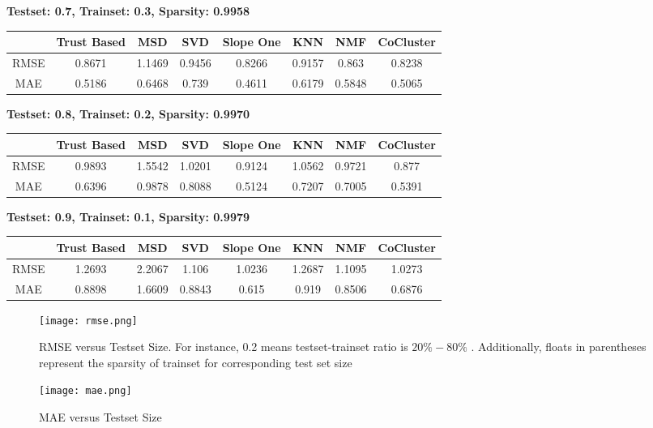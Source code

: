 	\vspace{1cm}
	\textbf{Testset: 0.7, Trainset: 0.3, Sparsity: 0.9958}
	\begin{center}
	\begin{tabular}{ | c | c | c | c | c | c | c | c |}
		\hline
		& Trust Based & MSD & SVD & Slope One & KNN & NMF & CoCluster\\ 
		\hline
		RMSE&0.8671  & 1.1469  & 0.9456  & 0.8266  & 0.9157  & 0.863  & 0.8238\\
		\hline
		MAE&0.5186  & 0.6468  & 0.739  & 0.4611  & 0.6179  & 0.5848  & 0.5065\\
		\hline
	\end{tabular}
	\end{center} 
	\vspace{1cm}
	\textbf{Testset: 0.8, Trainset: 0.2, Sparsity: 0.9970}
	\begin{center}
	\begin{tabular}{ | c | c | c | c | c | c | c | c |}
		\hline
		& Trust Based & MSD & SVD & Slope One & KNN & NMF & CoCluster\\ 
		\hline
		RMSE&0.9893  & 1.5542  & 1.0201  & 0.9124  & 1.0562  & 0.9721  & 0.877\\
		\hline
		MAE&0.6396  & 0.9878  & 0.8088  & 0.5124  & 0.7207  & 0.7005  & 0.5391\\
		\hline
	\end{tabular}
	\end{center} 
	\vspace{1cm}
	\textbf{Testset: 0.9, Trainset: 0.1, Sparsity: 0.9979}
	\begin{center}
	\begin{tabular}{ | c | c | c | c | c | c | c | c |}
		\hline
		& Trust Based & MSD & SVD & Slope One & KNN & NMF & CoCluster\\ 
		\hline
		RMSE&1.2693  & 2.2067  & 1.106  & 1.0236  & 1.2687  & 1.1095  & 1.0273\\
		\hline
		MAE&0.8898  & 1.6609  & 0.8843  & 0.615  & 0.919  & 0.8506  & 0.6876\\
		\hline
	\end{tabular}
	\end{center} 

\begin{figure}[H]
	\centering
	\texttt{[image: rmse.png]}
	\caption{RMSE versus Testset Size. For instance, 0.2 means testset-trainset ratio is $20\%-80\%$ . Additionally, floats in parentheses represent the sparsity of trainset for corresponding test set size}
	\label{fig:rmse}
\end{figure}

\begin{figure}[H]
	\centering
	\texttt{[image: mae.png]}
	\caption{MAE versus Testset Size}
	\label{fig:mae}
\end{figure}